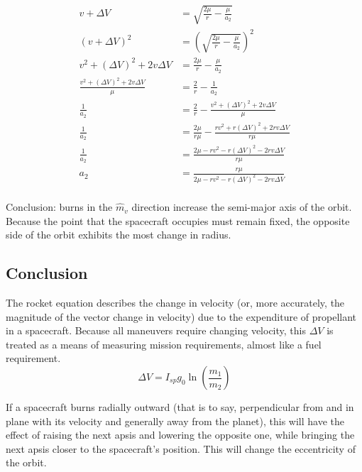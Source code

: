 \documentclass{article}
\begin{document}
\begin{align*}
    v + \Delta V                            & = \sqrt{\frac{2\mu}{r}-\frac{\mu}{a_2}}                        \\
    (v + \Delta V)^2                        & = \left(\sqrt{\frac{2\mu}{r}-\frac{\mu}{a_2}}\right)^2         \\
    v^2 + (\Delta V)^2 + 2v\Delta V         & = \frac{2\mu}{r}-\frac{\mu}{a_2}                               \\
    \frac{v^2+(\Delta V)^2+2v\Delta V}{\mu} & =\frac{2}{r}-\frac{1}{a_2}                                     \\
    \frac{1}{a_2}                           & =\frac{2}{r}-\frac{v^2+(\Delta V)^2+2v\Delta V}{\mu}           \\
    \frac{1}{a_2}                           & =\frac{2\mu}{r\mu}-\frac{rv^2+r(\Delta V)^2+2rv\Delta V}{r\mu} \\
    \frac{1}{a_2}                           & =\frac{2\mu-rv^2-r(\Delta V)^2-2rv\Delta V}{r\mu}              \\
    {a_2}                                   & =\frac{r\mu}{2\mu-rv^2-r(\Delta V)^2-2rv\Delta V}              \\
\end{align*}

Conclusion: burns in the $\hat{m}_v$ direction increase the semi-major axis of the orbit. Because the point that the spacecraft occupies must remain fixed, the opposite side of the orbit exhibits the most change in radius.

\bigskip\bigskip
\subsection{Conclusion}

\bigskip
The rocket equation describes the change in velocity (or, more accurately, the magnitude of the vector change in velocity) due to the expenditure of propellant in a spacecraft. Because all maneuvers require changing velocity, this $\Delta V$ is treated as a means of measuring mission requirements, almost like a fuel requirement.
$$\Delta V = I_{sp}g_0\ln\left(\frac{m_1}{m_2}\right)$$

\bigskip
If a spacecraft burns radially outward (that is to say, perpendicular from and in plane with its velocity and generally away from the planet), this will have the effect of raising the next apsis and lowering the opposite one, while bringing the next apsis closer to the spacecraft's position. This will change the eccentricity of the orbit.
\end{document}
